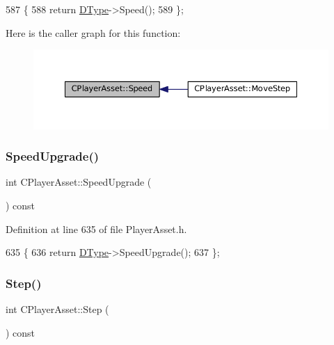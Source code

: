 \begin{DoxyCode}
587                          \{
588             \textcolor{keywordflow}{return} \hyperlink{classCPlayerAsset_a5d61f73471e1e6f0a6ab15f2ffa7b359}{DType}->Speed(); 
589         \};
\end{DoxyCode}
Here is the caller graph for this function\+:\nopagebreak
\begin{figure}[H]
\begin{center}
\leavevmode
\includegraphics[width=350pt]{classCPlayerAsset_af1c093600f1567e3abf1cefc0f5350d5_icgraph}
\end{center}
\end{figure}
\hypertarget{classCPlayerAsset_a6b6b17c9d4b1fe095120032bee4977af}{}\label{classCPlayerAsset_a6b6b17c9d4b1fe095120032bee4977af} 
\subsubsection{\texorpdfstring{Speed\+Upgrade()}{SpeedUpgrade()}}
{\footnotesize\ttfamily int C\+Player\+Asset\+::\+Speed\+Upgrade (\begin{DoxyParamCaption}{ }\end{DoxyParamCaption}) const\hspace{0.3cm}{\ttfamily [inline]}}



Definition at line 635 of file Player\+Asset.\+h.


\begin{DoxyCode}
635                                 \{
636             \textcolor{keywordflow}{return} \hyperlink{classCPlayerAsset_a5d61f73471e1e6f0a6ab15f2ffa7b359}{DType}->SpeedUpgrade();
637         \};
\end{DoxyCode}
\hypertarget{classCPlayerAsset_a787d4ac869cf7b5525b9a81f5d1bb5b1}{}\label{classCPlayerAsset_a787d4ac869cf7b5525b9a81f5d1bb5b1} 
\subsubsection{\texorpdfstring{Step()}{Step()}\hspace{0.1cm}{\footnotesize\ttfamily [1/2]}}
{\footnotesize\ttfamily int C\+Player\+Asset\+::\+Step (\begin{DoxyParamCaption}{ }\end{DoxyParamCaption}) const\hspace{0.3cm}{\ttfamily [inline]}}



